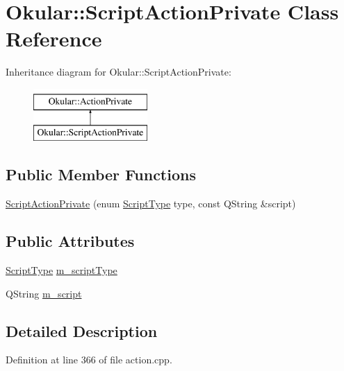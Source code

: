 \hypertarget{classOkular_1_1ScriptActionPrivate}{\section{Okular\+:\+:Script\+Action\+Private Class Reference}
\label{classOkular_1_1ScriptActionPrivate}
}
Inheritance diagram for Okular\+:\+:Script\+Action\+Private\+:\begin{figure}[H]
\begin{center}
\leavevmode
\includegraphics[height=2.000000cm]{classOkular_1_1ScriptActionPrivate}
\end{center}
\end{figure}
\subsection*{Public Member Functions}
\begin{DoxyCompactItemize}
\item 
\hyperlink{classOkular_1_1ScriptActionPrivate_a6199a98c99c53f7802d80eded45f1cf7}{Script\+Action\+Private} (enum \hyperlink{namespaceOkular_a061f34ff835b2d2142fef28bcfd09325}{Script\+Type} type, const Q\+String \&script)
\end{DoxyCompactItemize}
\subsection*{Public Attributes}
\begin{DoxyCompactItemize}
\item 
\hyperlink{namespaceOkular_a061f34ff835b2d2142fef28bcfd09325}{Script\+Type} \hyperlink{classOkular_1_1ScriptActionPrivate_a9075c555fafb3fb79499bc2b32002518}{m\+\_\+script\+Type}
\item 
Q\+String \hyperlink{classOkular_1_1ScriptActionPrivate_a833ca0e456a6128dbc0caa5368c2ffde}{m\+\_\+script}
\end{DoxyCompactItemize}


\subsection{Detailed Description}


Definition at line 366 of file action.\+cpp.



